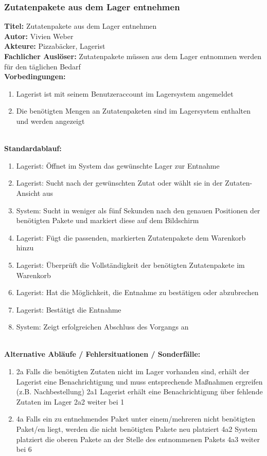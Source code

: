 \subsubsection{Zutatenpakete aus dem Lager entnehmen}
\textbf{Titel:} Zutatenpakete aus dem Lager entnehmen\\
\textbf{Autor:} Vivien Weber\\
\textbf{Akteure:} Pizzabäcker, Lagerist\\
\textbf{Fachlicher Auslöser:} Zutatenpakete müssen aus dem Lager entnommen werden für den täglichen Bedarf\\
\textbf{Vorbedingungen:}
\begin{enumerate}
	\item Lagerist ist mit seinem Benutzeraccount im Lagersystem angemeldet
	\item Die benötigten Mengen an Zutatenpaketen sind im Lagersystem enthalten und werden angezeigt
\end{enumerate}\\
\textbf{Standardablauf:}
\begin{enumerate}
	\item Lagerist: Öffnet im System das gewünschte Lager zur Entnahme
	\item Lagerist: Sucht nach der gewünschten Zutat oder wählt sie in der Zutaten-Ansicht aus
	\item System: Sucht in weniger als fünf Sekunden nach den genauen Positionen der benötigten Pakete und markiert diese auf dem Bildschirm
	\item Lagerist: Fügt die passenden, markierten Zutatenpakete dem Warenkorb hinzu
	\item Lagerist: Überprüft die Vollständigkeit der benötigten Zutatenpakete im Warenkorb
	\item Lagerist: Hat die Möglichkeit, die Entnahme zu bestätigen oder abzubrechen
	\item Lagerist: Bestätigt die Entnahme
	\item System: Zeigt erfolgreichen Abschluss des Vorgangs an
\end{enumerate}\\
\textbf{Alternative Abläufe / Fehlersituationen / Sonderfälle:}
\begin{enumerate}
	\item 2a Falls die benötigten Zutaten nicht im Lager vorhanden sind, erhält der Lagerist eine Benachrichtigung und muss entsprechende Maßnahmen ergreifen (z.B. Nachbestellung)
	\subitem 2a1 Lagerist erhält eine Benachrichtigung über fehlende Zutaten im Lager
	\subitem 2a2 weiter bei 1
	\item 4a Falls ein zu entnehmendes Paket unter einem/mehreren nicht benötigten Paket/en liegt, werden die nicht benötigten Pakete neu platziert
	\subitem 4a2 System platziert die oberen Pakete an der Stelle des entnommenen Pakets
	\subitem 4a3 weiter bei 6
\end{enumerate}\\
